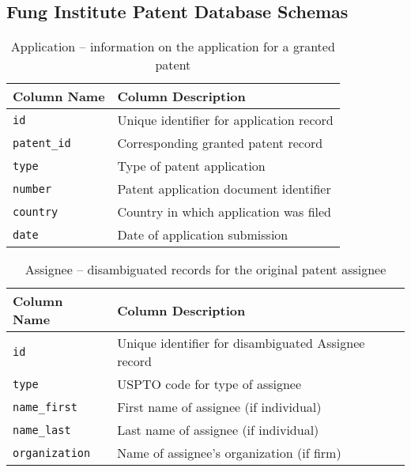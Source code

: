 \subsection*{Fung Institute Patent Database Schemas}

\begin{table}[ht]
\center
\begin{tabular}{| l | l |}
\hline
Column Name & Column Description \\
\hline
\verb`id` & Unique identifier for application record \\
\verb`patent_id` & Corresponding granted patent record \\
\verb`type` & Type of patent application \\
\verb`number` & Patent application document identifier \\
\verb`country` & Country in which application was filed \\
\verb`date` & Date of application submission \\
\hline
\end{tabular}
\caption{Application -- information on the application for a granted patent}
\end{table}

\begin{table}[ht]
\center
\begin{tabular}{| l | l |}
\hline
Column Name & Column Description \\
\hline
\verb`id` & Unique identifier for disambiguated Assignee record \\
\verb`type` & USPTO code for type of assignee \\
\verb`name_first` & First name of assignee (if individual) \\
\verb`name_last` & Last name of assignee (if individual) \\
\verb`organization` & Name of assignee's organization (if firm) \\
\hline
\end{tabular}
\caption{Assignee -- disambiguated records for the original patent assignee}
\end{table}

